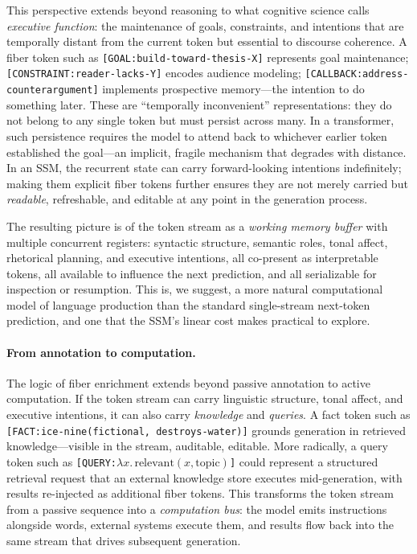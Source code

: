 \documentclass[11pt]{article}
\begin{document}
This perspective extends beyond reasoning to what cognitive science 
calls \emph{executive function}: the maintenance of goals, constraints, 
and intentions that are temporally distant from the current token but 
essential to discourse coherence. A fiber token such as 
\texttt{[GOAL:build-toward-thesis-X]} represents goal maintenance; 
\texttt{[CONSTRAINT:reader-lacks-Y]} encodes audience modeling; 
\texttt{[CALLBACK:address-counterargument]} implements prospective 
memory---the intention to do something later. These are ``temporally 
inconvenient'' representations: they do not belong to any single token 
but must persist across many. In a transformer, such persistence 
requires the model to attend back to whichever earlier token established 
the goal---an implicit, fragile mechanism that degrades with distance. 
In an SSM, the recurrent state can carry forward-looking intentions 
indefinitely; making them explicit fiber tokens further ensures they 
are not merely carried but \emph{readable}, refreshable, and editable 
at any point in the generation process.

The resulting picture is of the token stream as a \emph{working memory 
buffer} with multiple concurrent registers: syntactic structure, 
semantic roles, tonal affect, rhetorical planning, and executive 
intentions, all co-present as interpretable tokens, all available to 
influence the next prediction, and all serializable for inspection or 
resumption. This is, we suggest, a more natural computational model of 
language production than the standard single-stream next-token 
prediction, and one that the SSM's linear cost makes practical to explore.

\paragraph{From annotation to computation.}
The logic of fiber enrichment extends beyond passive annotation to 
active computation. If the token stream can carry linguistic structure, 
tonal affect, and executive intentions, it can also carry 
\emph{knowledge} and \emph{queries}. A fact token such as 
\texttt{[FACT:ice-nine(fictional, destroys-water)]} grounds generation 
in retrieved knowledge---visible in the stream, auditable, editable. 
More radically, a query token such as 
\texttt{[QUERY:$\lambda x.\,\text{relevant}(x, \text{topic})$]} could 
represent a structured retrieval request that an external knowledge 
store executes mid-generation, with results re-injected as additional 
fiber tokens. This transforms the token stream from a passive sequence 
into a \emph{computation bus}: the model emits instructions alongside 
words, external systems execute them, and results flow back into the 
same stream that drives subsequent generation.
\end{document}
